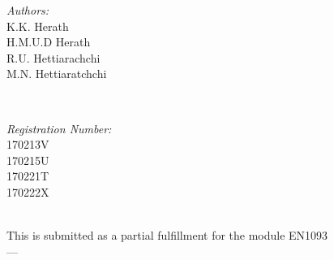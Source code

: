 \documentclass[12pt]{article}
\makeatletter
\let\thedate\@date
\makeatother
\begin{document}
\begin{titlepage}
	\begin{minipage}{0.4\textwidth}
		\begin{flushleft} \large
			\emph{Authors:}\\
			K.K. Herath\\
			H.M.U.D Herath\\
			R.U. Hettiarachchi\\
			M.N. Hettiaratchchi
			\end{flushleft}
			\end{minipage}~
			\begin{minipage}{0.4\textwidth}
			\begin{flushright} \large
			\emph{Registration Number:} \\
			170213V\\
			170215U\\
			170221T\\
			170222X
		\end{flushright}
	\end{minipage}\\[2 cm]
	 This is submitted as a partial fulfillment for the module EN1093\\[0.2 cm]
	 ---\\
	{\large \thedate}\\[2 cm]
	
	\vfill
	
\end{titlepage}

\newpage
\end{document}
